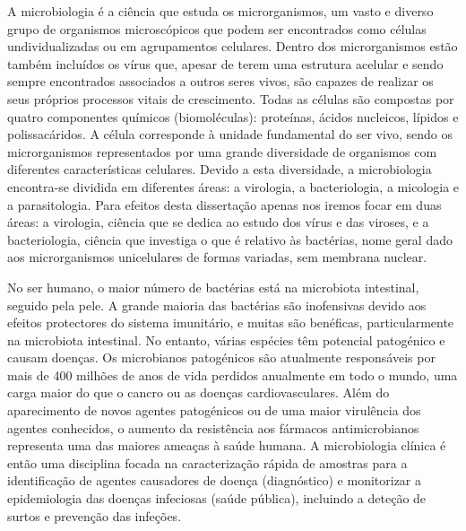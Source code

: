 A microbiologia é a ciência que estuda os microrganismos, um vasto e diverso grupo de organismos microscópicos que podem ser encontrados como células undividualizadas ou em agrupamentos celulares. Dentro dos microrganismos estão também incluídos os vírus que, apesar de terem uma estrutura acelular e sendo sempre encontrados associados a outros seres vivos, são capazes de realizar os seus próprios processos vitais de crescimento. Todas as células são compostas por quatro componentes químicos (biomoléculas): proteínas, ácidos nucleicos, lípidos e polissacáridos. A célula corresponde à unidade fundamental do ser vivo, sendo os microrganismos representados por uma grande diversidade de organismos com diferentes características celulares. Devido a esta diversidade, a microbiologia encontra-se dividida em diferentes áreas: a virologia, a bacteriologia, a micologia e a parasitologia. Para efeitos desta dissertação apenas nos iremos focar em duas áreas: a virologia, ciência que se dedica ao estudo dos vírus e das viroses, e a bacteriologia, ciência que investiga o que é relativo às bactérias, nome geral dado aos microrganismos unicelulares de formas variadas, sem membrana nuclear. 

No ser humano, o maior número de bactérias está na microbiota intestinal, seguido pela pele. A grande maioria das bactérias são inofensivas devido aos efeitos protectores do sistema imunitário, e muitas são benéficas, particularmente na microbiota intestinal. No entanto, várias espécies têm potencial patogénico e causam doenças. Os microbianos patogénicos são atualmente responsáveis por mais de 400 milhões de anos de vida perdidos anualmente em todo o mundo, uma carga maior do que o cancro ou as doenças cardiovasculares. Além do aparecimento de novos agentes patogénicos ou de uma maior virulência dos agentes conhecidos, o aumento da resistência aos fármacos antimicrobianos representa uma das maiores ameaças à saúde humana. A microbiologia clínica é então uma disciplina focada na caracterização rápida de amostras para a identificação de agentes causadores de doença (diagnóstico) e monitorizar a epidemiologia das doenças infeciosas (saúde pública), incluindo a deteção de surtos e prevenção das infeções. 

